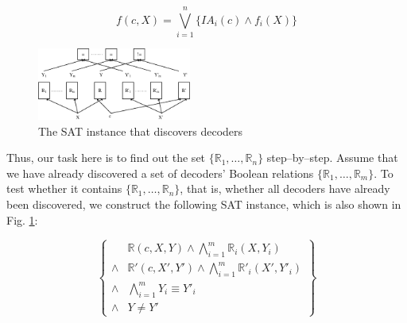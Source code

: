 \documentclass[journal]{IEEEtran}
\begin{document}
\begin{equation}\label{equ_fdfrewagain}
f(c,X)=\bigvee _{i=1}^{n} \{IA_i(c)\wedge f_i(X)\}
\end{equation}

%

\begin{figure}[t]
\centering
\includegraphics[width=0.45\textwidth]{fdtest}
\caption{The SAT instance that discovers decoders}
\label{fig_fdtest}
\end{figure}

Thus,
our task here is to find out the set $\{\mathbb{R}_1,\dots,\mathbb{R}_n\}$ step--by--step.
Assume that we have already discovered a set of decoders' Boolean relations $\{\mathbb{R}_1,\dots,\mathbb{R}_{m}\}$.
To test whether it contains $\{\mathbb{R}_1,\dots,\mathbb{R}_n\}$,
that is,
whether all decoders have already been discovered,
we construct the following SAT instance,
which is also shown in Fig. \ref{fig_fdtest}:



\begin{equation}\label{equ_fdtest}
\left\{
\begin{array}{cc}
      & \mathbb{R}(c,X,Y)\wedge \bigwedge_{i=1}^{m}\mathbb{R}_i(X,Y_i)  \\
\wedge& \mathbb{R}'(c,X',Y') \wedge \bigwedge_{i=1}^{m}\mathbb{R}'_i(X',Y'_i)  \\
\wedge&\bigwedge_{i=1}^{m}Y_i\equiv Y'_i\\
\wedge& Y\ne Y'
\end{array}
\right\}
\end{equation}
\end{document}

